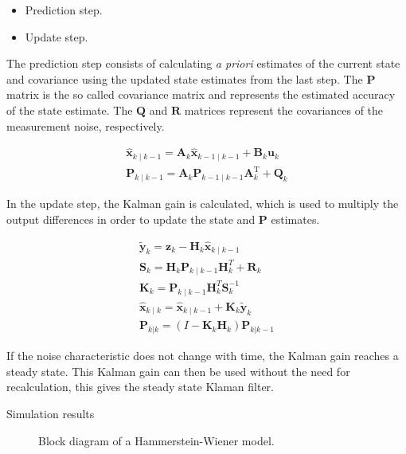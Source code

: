 \begin{itemize}
\item Prediction step.
\item Update step.
\end{itemize} 

The prediction step consists of calculating \textit{a priori} estimates of the current state and covariance using the updated state estimates from the last step. 
The $\mathbf{P}$ matrix is the so called covariance matrix and represents the estimated accuracy of the state estimate.
The $\mathbf{Q}$ and $\mathbf{R}$ matrices represent the covariances of the measurement noise, respectively.

\begin{gather}
\hat{\mathbf{x}}_{k\mid k-1} = \mathbf{A}_{k}\hat{\mathbf{x}}_{k-1\mid k-1} + \mathbf{B}_{k} \mathbf{u}_{k} \\
\mathbf{P}_{k\mid k-1} =  \mathbf{A}_{k} \mathbf{P}_{k-1\mid k-1} \mathbf{A}_{k}^{\text{T}} + \mathbf{Q}_{k} 
\end{gather}

In the update step, the Kalman gain is calculated, which is used to multiply the output differences in order to update the state and $\mathbf{P}$  estimates.

\begin{gather}
\tilde{\mathbf{y}}_k = \mathbf{z}_k - \mathbf{H}_k\hat{\mathbf{x}}_{k\mid k-1}\\
\mathbf{S}_k = \mathbf{H}_k \mathbf{P}_{k\mid k-1} \mathbf{H}_k^T + \mathbf{R}_k\\
\mathbf{K}_k = \mathbf{P}_{k\mid k-1}\mathbf{H}_k^T \mathbf{S}_k^{-1}\\
\hat{\mathbf{x}}_{k\mid k} = \hat{\mathbf{x}}_{k\mid k-1} + \mathbf{K}_k\tilde{\mathbf{y}}_k \\
\mathbf{P}_{k|k} = (I - \mathbf{K}_k \mathbf{H}_k) \mathbf{P}_{k|k-1} 
\end{gather}

If the noise characteristic does not change with time, the Kalman gain reaches a steady state.
This Kalman gain can then be used without the need for recalculation, this gives the steady state Klaman filter.

Simulation results 

\begin{figure} 
	\resizebox{\textwidth}{!}{
		
	}
	\caption{Block diagram of a Hammerstein-Wiener model.}
	\label{weiner}
\end{figure}
